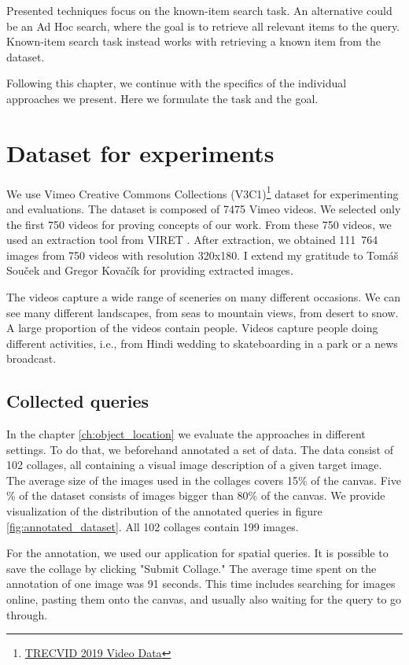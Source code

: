 Presented techniques focus on the known-item search task. An alternative could be an Ad Hoc search, where the goal is to retrieve all relevant items to the query. Known-item search task instead works with retrieving a known item from the dataset.

Following this chapter, we continue with the specifics of the individual approaches we present. Here we formulate the task and the goal.


\section{Dataset for experiments}
\label{s:dataset}

We use Vimeo Creative Commons Collections (V3C1)\footnote{\href{https://www-nlpir.nist.gov/projects/tv2019/data.html}{TRECVID 2019 Video Data}} dataset for experimenting and evaluations. The dataset is composed of 7475 Vimeo videos. We selected only the first 750 videos for proving concepts of our work. From these 750 videos, we used an extraction tool from VIRET \cite{lokovc2019framework}. After extraction, we obtained 111\ 764 images from 750 videos with resolution 320x180. I extend my gratitude to Tomáš Souček and Gregor Kovačík for providing extracted images.

The videos capture a wide range of sceneries on many different occasions. We can see many different landscapes, from seas to mountain views, from desert to snow. A large proportion of the videos contain people. Videos capture people doing different activities, i.e., from Hindi wedding to skateboarding in a park or a news broadcast.

\subsection{Collected queries}

In the chapter \ref{ch:object_location} we evaluate the approaches in different settings. To do that, we beforehand annotated a set of data. The data consist of 102 collages, all containing a visual image description of a given target image. The average size of the images used in the collages covers 15\% of the canvas. Five \% of the dataset consists of images bigger than 80\% of the canvas. We provide visualization of the distribution of the annotated queries in figure \ref{fig:annotated_dataset}. All 102 collages contain 199 images.

For the annotation, we used our application for spatial queries. It is possible to save the collage by clicking "Submit Collage." The average time spent on the annotation of one image was 91 seconds. This time includes searching for images online, pasting them onto the canvas, and usually also waiting for the query to go through.

